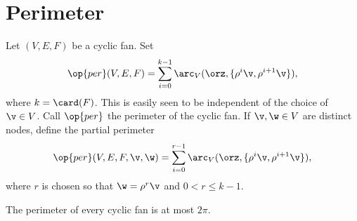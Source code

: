 



\section{Perimeter}


\begin{definition}[perimeter]\label{lemma:perim}
Let $(V,E,F)$ be a cyclic fan.    Set
\begin{displaymath}
  \op{per}(V,E,F) 
= \sum_{i=0}^{k-1} \arc_V(\orz,\{\rho^i \v,\rho^{i+1} \v\}), 
\end{displaymath}
where $k=\card(F)$.  This is easily seen to be independent of the
choice of $\v\in V$.  Call $\op{per}$ the perimeter of the cyclic fan.
If $\v,\w\in V$ are distinct nodes, define the partial perimeter
\begin{displaymath}
  \op{per}(V,E,F,\v,\w) 
= \sum_{i=0}^{r-1} \arc_V(\orz,\{\rho^i \v,\rho^{i+1} \v\}), 
\end{displaymath}
where $r$ is chosen so that $\w=\rho^r \v$ and $0<r\le k-1$.
\end{definition}
%
%
%



\begin{lemma}
The perimeter of every cyclic fan is at most $2\pi$.
\end{lemma}
%
%

